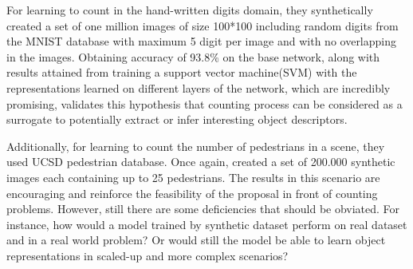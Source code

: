 For learning to count in the hand-written digits domain, they synthetically created a set of one million images of size 100*100 including random digits from the MNIST database with maximum 5 digit per image and with no overlapping in the images. Obtaining accuracy of 93.8\% on the base network, along with results attained from training a support vector machine(SVM) with the representations learned on different layers of the network, which are incredibly promising, validates this hypothesis that counting process can be considered as a surrogate to potentially extract or infer interesting object descriptors\cite{segui2015learning}. 

Additionally, for learning to count the number of pedestrians in a scene, they used UCSD pedestrian database\cite{chan2008privacy}. Once again, \citealt*{segui2015learning} created a set of 200.000 synthetic images each containing up to 25 pedestrians. The results in this scenario are encouraging and reinforce the feasibility of the proposal in front of counting problems. However, still there are some deficiencies that should be obviated. For instance, how would a model trained by synthetic dataset perform on real dataset and in a real world problem? Or would still the model be able to learn object representations in scaled-up and more complex scenarios?





